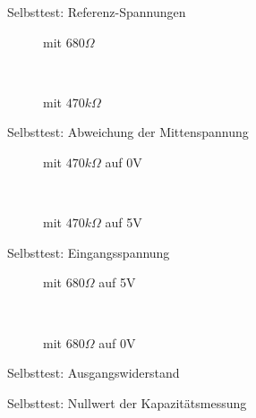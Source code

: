 \begin{figure}[H]
  \centering
  
  \caption{Selbsttest: Referenz-Spannungen}
  \label{fig:SelfTref}
\end{figure}

\begin{figure}[H]
  \begin{subfigure}[b]{9cm}
    \centering
    \resizebox{9cm}{!}{}
    \caption{mit \(680 \Omega\)}
    \label{fig:SelfTMitL}
  \end{subfigure}
  ~
  \begin{subfigure}[b]{9cm}
    \centering
    \resizebox{9cm}{!}{}
    \caption{mit \(470 k\Omega\)}
    \label{fig:SelfTMitH}
  \end{subfigure}
  \caption{Selbsttest: Abweichung der Mittenspannung}
\end{figure}

\begin{figure}[H]
  \begin{subfigure}[b]{9cm}
  \centering
    \resizebox{9cm}{!}{}
    \caption{mit \(470 k\Omega\) auf 0V}
    \label{fig:SelfTlowH}
  \end{subfigure}
  ~
  \begin{subfigure}[b]{9cm}
  \centering
    \resizebox{9cm}{!}{}
    \caption{mit \(470 k\Omega\) auf 5V}
    \label{fig:SelfTtopH}
  \end{subfigure}
  \caption{Selbsttest: Eingangsspannung}
\end{figure}

\begin{figure}[H]
  \begin{subfigure}[b]{9cm}
  \centering
    \resizebox{9cm}{!}{}
    \caption{mit \(680 \Omega\) auf 5V}
    \label{fig:SelfTRoL}
  \end{subfigure}
  ~
  \begin{subfigure}[b]{9cm}
  \centering
    \resizebox{9cm}{!}{}
    \caption{mit \(680 \Omega\) auf 0V}
    \label{fig:SelfTRoH}
  \end{subfigure}
  \caption{Selbsttest: Ausgangswiderstand}
\end{figure}

\begin{figure}[H]
  \centering
  \resizebox{9cm}{!}{}
  \caption{Selbsttest: Nullwert der Kapazitätsmessung}
  \label{fig:SelfTcap}
\end{figure}

